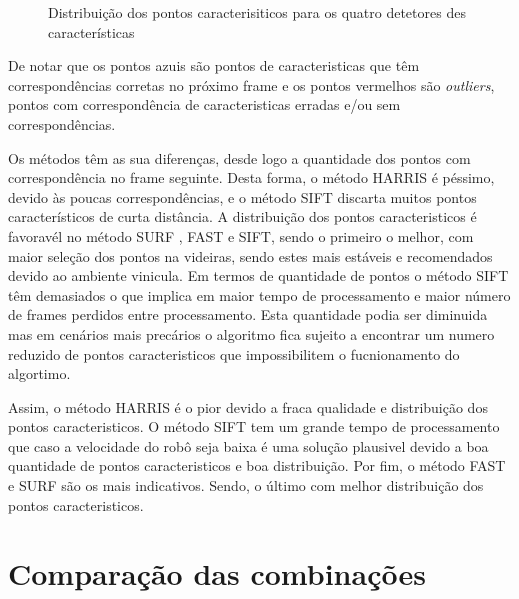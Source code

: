 \begin{figure}[h!]
	\centering
	\qquad

	\qquad
	\caption{Distribuição dos pontos caracterisiticos para os quatro detetores des características}\label{fig:metodosALL}
\end{figure}


De notar que os pontos azuis são pontos de caracteristicas que têm correspondências corretas no próximo frame e os pontos vermelhos são \textit{outliers}, pontos com correspondência de caracteristicas erradas e/ou sem correspondências.

Os métodos têm as sua diferenças, desde logo a quantidade dos pontos com correspondência no frame seguinte. Desta forma, o método HARRIS é péssimo, devido às poucas correspondências, e o método SIFT discarta muitos pontos característicos de curta distância. A distribuição dos pontos caracteristicos é favoravél no método SURF , FAST e SIFT, sendo o primeiro o melhor, com maior seleção dos pontos na videiras, sendo estes mais estáveis e recomendados devido ao ambiente vinicula. Em termos de quantidade de pontos o método SIFT têm demasiados o que implica em maior tempo de processamento e maior número de frames perdidos entre processamento. Esta quantidade podia ser diminuida mas em cenários 
mais precários o algoritmo fica sujeito a encontrar um numero reduzido de pontos caracteristicos que impossibilitem o fucnionamento do algortimo. 

Assim, o método HARRIS é o pior devido a fraca qualidade e distribuição dos pontos caracteristicos. O método SIFT tem um grande tempo de processamento que caso a velocidade do robô seja baixa é uma solução plausivel devido a boa quantidade de pontos caracteristicos e boa distribuição. Por fim, o método FAST e SURF são os mais indicativos. Sendo, o último com melhor distribuição  dos pontos caracteristicos. 


\section{Comparação das combinações}


